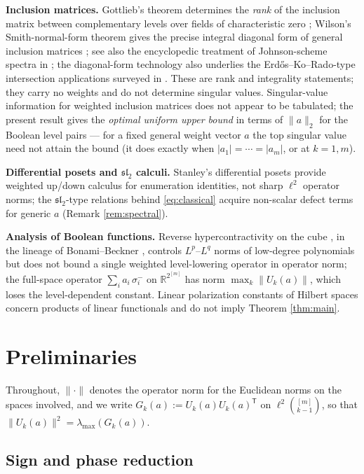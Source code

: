 \documentclass[11pt]{article}
\theoremstyle{remark}
\begin{document}
\textbf{Inclusion matrices.} Gottlieb's theorem determines the \emph{rank} of
the inclusion matrix between complementary levels over fields of
characteristic zero \cite{gottlieb1966}; Wilson's Smith-normal-form theorem
gives the precise integral diagonal form of general inclusion matrices
\cite{wilson1990}; see also the encyclopedic treatment of Johnson-scheme
spectra in \cite{godsilroyle2001}; the diagonal-form technology also underlies
the Erd\H os--Ko--Rado-type intersection applications surveyed in
\cite{wilson1984}. These are rank and integrality statements;
they carry no weights and do not determine singular values. Singular-value
information for weighted inclusion matrices does not appear to be tabulated;
the present result gives the \emph{optimal uniform upper bound} in terms of
$\|a\|_2$ for the Boolean level pairs --- for a fixed general weight vector
$a$ the top singular value need not attain the bound (it does exactly when
$|a_1|=\cdots=|a_m|$, or at $k=1,m$).

\textbf{Differential posets and $\mathfrak{sl}_2$ calculi.} Stanley's
differential posets \cite{stanley1988} provide weighted up/down calculus
for enumeration identities, not sharp $\ell^2$ operator norms; the
$\mathfrak{sl}_2$-type relations behind \eqref{eq:classical} acquire
non-scalar defect terms for generic $a$ (Remark \ref{rem:spectral}).

\textbf{Analysis of Boolean functions.} Reverse hypercontractivity on the
cube \cite{mos2013}, in the lineage of Bonami--Beckner
\cite{bonami1970,beckner1975}, controls $L^p$--$L^q$ norms of low-degree
polynomials but does not bound a single weighted level-lowering operator in
operator norm; the full-space operator $\sum_i a_i\,\sigma_i^{-}$ on
$\mathbb{R}^{2^{[m]}}$ has norm $\max_k\|U_k(a)\|$, which loses the
level-dependent constant. Linear polarization constants of Hilbert spaces
\cite{matolcsi2005,pappas2004} concern products of linear functionals and
do not imply Theorem \ref{thm:main}.

\section{Preliminaries}\label{sec:prelim}

Throughout, $\|\cdot\|$ denotes the operator norm for the Euclidean norms
on the spaces involved, and we write
$G_k(a):=U_k(a)U_k(a)^{\mathsf T}$ on $\ell^2\binom{[m]}{k-1}$, so that
$\|U_k(a)\|^2=\lambda_{\max}(G_k(a))$.

\subsection{Sign and phase reduction}\label{subsec:sign}
\end{document}

